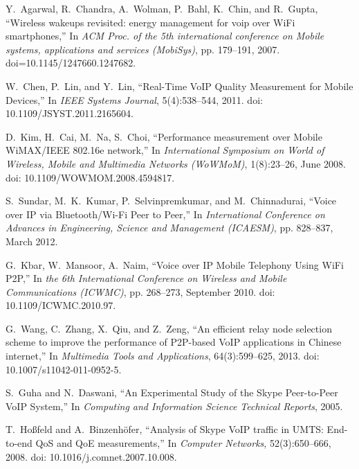 \documentclass[conference]{IEEEtran}
\begin{document}
\begin{thebibliography}{10}
Y.~Agarwal, R.~Chandra, A.~Wolman, P.~Bahl, K.~Chin, and R.~Gupta,
\newblock ``Wireless wakeups revisited: energy management for voip over WiFi 
smartphones,'' 
\newblock In {\em ACM Proc. of the 5th international conference on Mobile 
systems, applications and services (MobiSys)}, pp. 179--191, 2007. 
doi=10.1145/1247660.1247682.

W.~Chen, P.~Lin, and Y.~Lin, 
\newblock ``Real-Time VoIP Quality Measurement for Mobile Devices,'' 
\newblock In {\em IEEE Systems Journal}, 5(4):538--544, 2011. 
doi: 10.1109/JSYST.2011.2165604.

D.~Kim, H.~Cai, M.~Na, S.~Choi, 
\newblock ``Performance measurement over Mobile WiMAX/IEEE 802.16e network,''
\newblock In {\em International Symposium on World of Wireless, Mobile and 
Multimedia Networks (WoWMoM)}, 1(8):23--26, June 2008.
doi: 10.1109/WOWMOM.2008.4594817.
 
S.~Sundar, M.~K.~Kumar, P.~Selvinpremkumar, and M.~Chinnadurai, 
\newblock ``Voice over IP via Bluetooth/Wi-Fi Peer to Peer,'' 
\newblock In {\em International Conference on Advances in Engineering, Science 
and Management (ICAESM)}, pp. 828--837, March 2012.

G.~Kbar, W.~Mansoor, A.~Naim, 
\newblock ``Voice over IP Mobile Telephony Using WiFi P2P,''
\newblock In {\em the 6th International Conference on Wireless and Mobile 
Communications (ICWMC)}, pp. 268--273, September 2010. 
doi: 10.1109/ICWMC.2010.97.
 
G.~Wang, C.~Zhang, X.~Qiu, and Z.~Zeng, 
\newblock ``An efficient relay node selection scheme to improve the performance 
of P2P-based VoIP applications in Chinese internet,''
\newblock In {\em Multimedia Tools and Applications}, 64(3):599--625, 2013. 
doi: 10.1007/s11042-011-0952-5.

S.~Guha and N.~Daswani, 
\newblock ``An Experimental Study of the Skype Peer-to-Peer VoIP System,'' 
\newblock In {\em Computing and Information Science Technical 
Reports}, 2005.

T.~Hoßfeld and A.~Binzenhöfer, 
\newblock ``Analysis of Skype VoIP traffic in UMTS: End-to-end QoS and QoE 
measurements,''
\newblock In {\em Computer Networks}, 52(3):650--666, 2008.
doi: 10.1016/j.comnet.2007.10.008.


\end{thebibliography}
\end{document}
